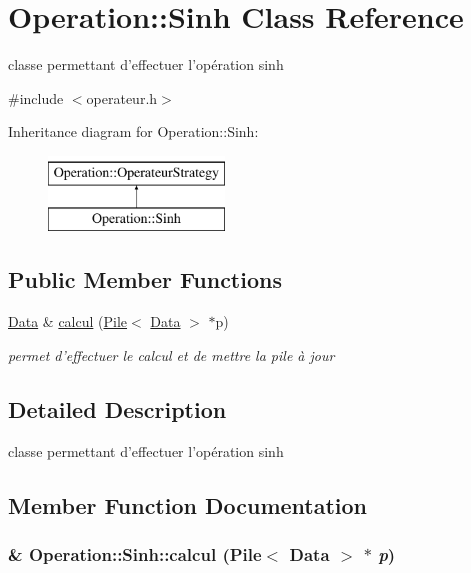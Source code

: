 \hypertarget{classOperation_1_1Sinh}{
\section{Operation::Sinh Class Reference}
\label{classOperation_1_1Sinh}
}


classe permettant d'effectuer l'opération sinh  




{\ttfamily \#include $<$operateur.h$>$}

Inheritance diagram for Operation::Sinh:\begin{figure}[H]
\begin{center}
\leavevmode
\includegraphics[height=2cm]{classOperation_1_1Sinh}
\end{center}
\end{figure}
\subsection*{Public Member Functions}
\begin{DoxyCompactItemize}
\item 
\hyperlink{classNombre_1_1Data}{Data} \& \hyperlink{classOperation_1_1Sinh_a9d8371de7bdc30b18bda09e88158899b}{calcul} (\hyperlink{classPile}{Pile}$<$ \hyperlink{classNombre_1_1Data}{Data} $>$ $\ast$p)
\begin{DoxyCompactList}\small\item\em permet d'effectuer le calcul et de mettre la pile à jour \item\end{DoxyCompactList}\end{DoxyCompactItemize}


\subsection{Detailed Description}
classe permettant d'effectuer l'opération sinh 

\subsection{Member Function Documentation}
\hypertarget{classOperation_1_1Sinh_a9d8371de7bdc30b18bda09e88158899b}{
\subsubsection[{calcul}]{\& Operation::Sinh::calcul ({\bf Pile}$<$ {\bf Data} $>$ $\ast$ {\em p})}}
\label{classOperation_1_1Sinh_a9d8371de7bdc30b18bda09e88158899b}


